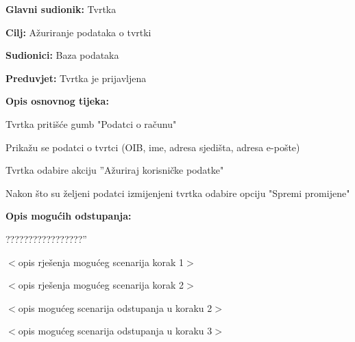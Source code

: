 \noindent {}
\begin{packed_item}
	
	\item \textbf{Glavni sudionik: }Tvrtka
	\item  \textbf{Cilj:} Ažuriranje podataka o tvrtki
	\item  \textbf{Sudionici:} Baza podataka
	\item  \textbf{Preduvjet:} Tvrtka je prijavljena
	\item  \textbf{Opis osnovnog tijeka:}
	
	\item[] \begin{packed_enum}
		
		\item Tvrtka pritišće gumb "Podatci o računu" 
		\item Prikažu se podatci o tvrtci (OIB, ime, adresa sjedišta, adresa e-pošte)
		\item Tvrtka odabire akciju ”Ažuriraj korisničke podatke"
		\item Nakon što su željeni podatci izmijenjeni tvrtka odabire opciju "Spremi promijene"
	
	\end{packed_enum}
	
	\item  \textbf{Opis mogućih odstupanja:}
	
	\item[] \begin{packed_item}
		
		\item[2.a] ?????????????????''
		\item[] \begin{packed_enum}
			
			\item $<$opis rješenja mogućeg scenarija korak 1$>$
			\item $<$opis rješenja mogućeg scenarija korak 2$>$
			
		\end{packed_enum}
		\item[2.b] $<$opis mogućeg scenarija odstupanja u koraku 2$>$
		\item[3.a] $<$opis mogućeg scenarija odstupanja  u koraku 3$>$
		
	\end{packed_item}
\end{packed_item}

